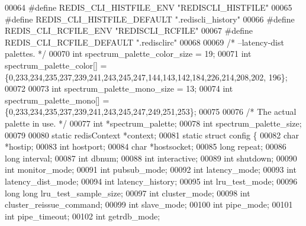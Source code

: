 \begin{DoxyCode}
00064 \textcolor{preprocessor}{#}\textcolor{preprocessor}{define} \textcolor{preprocessor}{REDIS\_CLI\_HISTFILE\_ENV} \textcolor{stringliteral}{"REDISCLI\_HISTFILE"}
00065 \textcolor{preprocessor}{#}\textcolor{preprocessor}{define} \textcolor{preprocessor}{REDIS\_CLI\_HISTFILE\_DEFAULT} \textcolor{stringliteral}{".rediscli\_history"}
00066 \textcolor{preprocessor}{#}\textcolor{preprocessor}{define} \textcolor{preprocessor}{REDIS\_CLI\_RCFILE\_ENV} \textcolor{stringliteral}{"REDISCLI\_RCFILE"}
00067 \textcolor{preprocessor}{#}\textcolor{preprocessor}{define} \textcolor{preprocessor}{REDIS\_CLI\_RCFILE\_DEFAULT} \textcolor{stringliteral}{".redisclirc"}
00068 
00069 \textcolor{comment}{/* --latency-dist palettes. */}
00070 \textcolor{keywordtype}{int} spectrum\_palette\_color\_size = 19;
00071 \textcolor{keywordtype}{int} spectrum\_palette\_color[] = \{0,233,234,235,237,239,241,243,245,247,144,143,142,184,226,214,208,202,
      196\};
00072 
00073 \textcolor{keywordtype}{int} spectrum\_palette\_mono\_size = 13;
00074 \textcolor{keywordtype}{int} spectrum\_palette\_mono[] = \{0,233,234,235,237,239,241,243,245,247,249,251,253\};
00075 
00076 \textcolor{comment}{/* The actual palette in use. */}
00077 \textcolor{keywordtype}{int} *spectrum\_palette;
00078 \textcolor{keywordtype}{int} spectrum\_palette\_size;
00079 
00080 \textcolor{keyword}{static} redisContext *context;
00081 \textcolor{keyword}{static} \textcolor{keyword}{struct} config \{
00082     \textcolor{keywordtype}{char} *hostip;
00083     \textcolor{keywordtype}{int} hostport;
00084     \textcolor{keywordtype}{char} *hostsocket;
00085     \textcolor{keywordtype}{long} repeat;
00086     \textcolor{keywordtype}{long} interval;
00087     \textcolor{keywordtype}{int} dbnum;
00088     \textcolor{keywordtype}{int} interactive;
00089     \textcolor{keywordtype}{int} shutdown;
00090     \textcolor{keywordtype}{int} monitor\_mode;
00091     \textcolor{keywordtype}{int} pubsub\_mode;
00092     \textcolor{keywordtype}{int} latency\_mode;
00093     \textcolor{keywordtype}{int} latency\_dist\_mode;
00094     \textcolor{keywordtype}{int} latency\_history;
00095     \textcolor{keywordtype}{int} lru\_test\_mode;
00096     \textcolor{keywordtype}{long} \textcolor{keywordtype}{long} lru\_test\_sample\_size;
00097     \textcolor{keywordtype}{int} cluster\_mode;
00098     \textcolor{keywordtype}{int} cluster\_reissue\_command;
00099     \textcolor{keywordtype}{int} slave\_mode;
00100     \textcolor{keywordtype}{int} pipe\_mode;
00101     \textcolor{keywordtype}{int} pipe\_timeout;
00102     \textcolor{keywordtype}{int} getrdb\_mode;

\end{DoxyCode}
